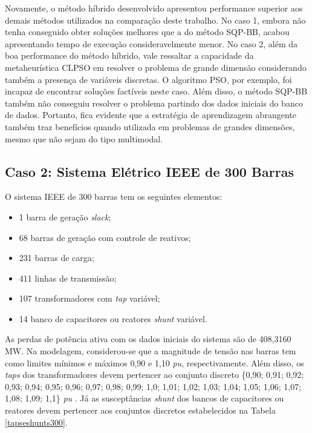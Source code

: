 \documentclass[
	12pt,				%
	openany,			%
	twoside,			%
	a4paper,			%
	chapter=TITLE,		%
	section=Title,		%
	subsection=Title,	%
	subsubsection=Title,%
	english,			%
	french,				%
	spanish,			%
	brazil			%
	]{abntex2}
\begin{document}
\begin{ERRATA}
Novamente, o método híbrido desenvolvido apresentou performance superior aos demais métodos utilizados na comparação deste trabalho. No caso 1, embora não tenha conseguido obter soluções melhores que a do método SQP-BB, acabou apresentando tempo de execução consideravelmente menor. No caso 2, além da boa performance do método híbrido, vale ressaltar a capacidade da metaheurística CLPSO em resolver o problema de grande dimensão considerando também a presença de variáveis discretas. O algoritmo PSO, por exemplo, foi incapaz de encontrar soluções factíveis neste caso. Além disso, o método SQP-BB também não conseguiu resolver o problema partindo dos dados iniciais do banco de dados. Portanto, fica evidente que a estratégia de aprendizagem abrangente também traz benefícios quando utilizada em problemas de grandes dimensões, mesmo que não sejam do tipo multimodal.

\subsection{Caso 2: Sistema Elétrico IEEE de 300 Barras}



O sistema IEEE de 300 barras tem os seguintes elementos:

\begin{itemize}
    \item 1 barra de geração \emph{slack};
    \item 68 barras de geração com controle de reativos;
    \item 231 barras de carga;
    \item 411 linhas de transmissão;
    \item 107 transformadores com \emph{tap} variável;
    \item 14 banco de capacitores ou reatores \emph{shunt} variável.
\end{itemize}


As perdas de potência ativa com os dados iniciais do sistema são de 408,3160 MW. Na modelagem, considerou-se que a magnitude de tensão nas barras tem como limites mínimos e máximos 0,90 e 1,10 \emph{pu}, respectivamente. Além disso, os \emph{taps} dos transformadores devem pertencer ao conjunto discreto \{0,90; 0,91; 0,92; 0,93; 0,94; 0,95; 0,96; 0,97; 0,98; 0,99; 1,0; 1,01; 1,02; 1,03; 1,04; 1,05; 1,06; 1,07; 1,08; 1,09; 1,1\} \emph{pu} \cite{antlion}. Já as susceptâncias \emph{shunt} dos bancos de capacitores ou reatores devem pertencer aos conjuntos discretos estabelecidos na Tabela \ref{tapseshunts300}.



\end{ERRATA}
\end{document}
